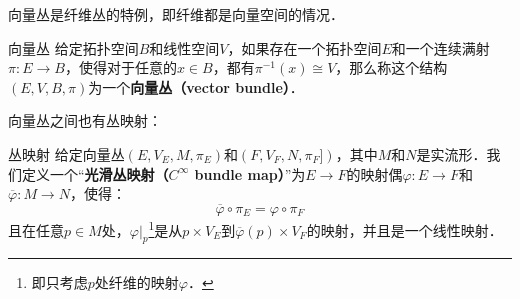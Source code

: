 
向量丛是纤维丛的特例，即纤维都是向量空间的情况．

\begin{definition}{向量丛}
给定拓扑空间$B$和线性空间$V$，如果存在一个拓扑空间$E$和一个连续满射$\pi:E\rightarrow B$，使得对于任意的$x\in B$，都有$\pi^{-1}(x)\cong V$，那么称这个结构$(E, V, B, \pi)$为一个\textbf{向量丛（vector bundle）}．
\end{definition}

向量丛之间也有丛映射：

\begin{definition}{丛映射}
给定向量丛$(E, V_E, M, \pi_E)$和$(F, V_F, N, \pi_F])$，其中$M$和$N$是实流形．我们定义一个“\textbf{光滑丛映射（$C^\infty$ bundle map）}”为$E\rightarrow F$的映射偶$\varphi: E\rightarrow F$和$\overline{\varphi}: M\rightarrow N$，使得：
\begin{equation}
\overline{\varphi}\circ\pi_E=\varphi\circ\pi_F
\end{equation}
且在任意$p\in M$处，$\varphi|_p$\footnote{即只考虑$p$处纤维的映射$\varphi$．}是从$p\times V_E$到$\overline{\varphi}(p)\times V_F$的映射，并且是一个线性映射．
\end{definition}





